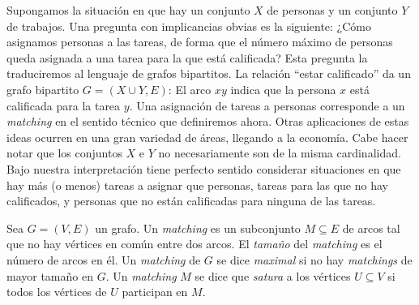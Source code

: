   Supongamos la situación
  en que hay un conjunto \(X\) de personas
  y un conjunto \(Y\) de trabajos.
  Una pregunta con implicancias obvias
  es la siguiente:
  ¿Cómo asignamos personas a las tareas,
  de forma que el número máximo de personas queda asignada
  a una tarea para la que está calificada?
  Esta pregunta la traduciremos al lenguaje de grafos bipartitos.
  La relación ``estar calificado'' da un grafo bipartito
  \(G = (X \cup Y, E)\):
  El arco \(x y\) indica que la persona \(x\)
  está calificada para la tarea \(y\).
  Una asignación de tareas a personas
  corresponde a un \emph{\foreignlanguage{english}{matching}}
  en el sentido técnico que definiremos ahora.
  Otras aplicaciones de estas ideas
  ocurren en una gran variedad de áreas,
  llegando a la economía.
  Cabe hacer notar
  que los conjuntos \(X\) e \(Y\)
  no necesariamente son de la misma cardinalidad.
  Bajo nuestra interpretación
  tiene perfecto sentido considerar situaciones en que hay más
  (o menos)
  tareas a asignar que personas,
  tareas para las que no hay calificados,
  y personas que no están calificadas para ninguna de las tareas.

  \begin{definition}
    Sea \(G = (V, E)\) un grafo.
    Un \emph{\foreignlanguage{english}{matching}}
    es un subconjunto \(M \subseteq E\) de arcos
    tal que no hay vértices en común entre dos arcos.
    El \emph{tamaño} del \emph{\foreignlanguage{english}{matching}}
    es el número de arcos en él.
    Un \emph{\foreignlanguage{english}{matching}} de \(G\)
    se dice \emph{maximal}
    si no hay \emph{\foreignlanguage{english}{matchings}}
    de mayor tamaño
    en \(G\).
    Un \emph{\foreignlanguage{english}{matching}} \(M\)
    se dice que \emph{satura} a los vértices \(U \subseteq V\)
    si todos los vértices de \(U\) participan en \(M\).
  \end{definition}

